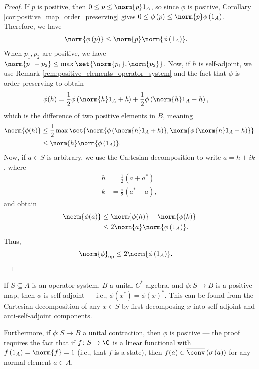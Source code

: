 \begin{proof}
  If $p$ is positive, then $0\leq p \leq \norm{p}1_A$, so since $\phi$ is positive, Corollary \ref{cor:positive_map_order_preserving} gives $0\leq \phi\left( p \right)\leq \norm{p}\phi\left( 1_A \right)$. Therefore, we have
  \begin{align*}
    \norm{\phi\left( p \right)} &\leq \norm{p}\norm{\phi\left( 1_A \right)}.
  \end{align*}
  When $p_1,p_2$ are positive, we have $\norm{p_1 - p_2}\leq \max\set{\norm{p_1},\norm{p_2}}$. Now, if $h$ is self-adjoint, we use Remark \ref{rem:positive_elements_operator_system} and the fact that $\phi$ is order-preserving to obtain
  \begin{align*}
    \phi(h) &= \frac{1}{2}\phi\left( \norm{h}1_A + h \right) + \frac{1}{2}\phi\left( \norm{h}1_A - h \right),
  \end{align*}
  which is the difference of two positive elements in $B$, meaning
  \begin{align*}
    \norm{\phi(h)} &\leq \frac{1}{2}\max\set{\norm{\phi\left( \norm{h}1_A + h \right)},\norm{\phi\left( \norm{h}1_A - h \right)}}\\
                   &\leq \norm{h}\norm{\phi\left( 1_A \right)}.
  \end{align*}
  Now, if $a\in S$ is arbitrary, we use the Cartesian decomposition to write $a = h + ik$, where
  \begin{align*}
    h &= \frac{1}{2}\left( a + a^{\ast} \right)\\
    k &= \frac{i}{2}\left( a^{\ast}-a \right),
  \end{align*}
  and obtain
  \begin{align*}
    \norm{\phi(a)} &\leq \norm{\phi(h)} + \norm{\phi(k)}\\
                   &\leq 2\norm{a}\norm{\phi\left( 1_A \right)}.
  \end{align*}
  Thus,
  \begin{align*}
    \norm{\phi}_{\op} &\leq 2\norm{\phi\left( 1_A \right)}.
  \end{align*}
\end{proof}
\begin{remark}
  If $S\subseteq A$ is an operator system, $B$ a unital $C^{\ast}$-algebra, and $\phi\colon S\rightarrow B$ is a positive map, then $\phi$ is self-adjoint --- i.e., $\phi\left( x^{\ast} \right) = \phi\left( x \right)^{\ast}$. This can be found from the Cartesian decomposition of any $x\in S$ by first decomposing $x$ into self-adjoint and anti-self-adjoint components.\newline

  Furthermore, if $\phi\colon S\rightarrow B$ a unital contraction, then $\phi$ is positive --- the proof requires the fact that if $f\colon S\rightarrow \C$ is a linear functional with $f\left(1_A\right) = \norm{f} = 1$ (i.e., that $f$ is a state), then $f(a)\in \overline{\conv}\left( \sigma\left( a \right) \right)$ for any normal element $a\in A$.
\end{remark}
